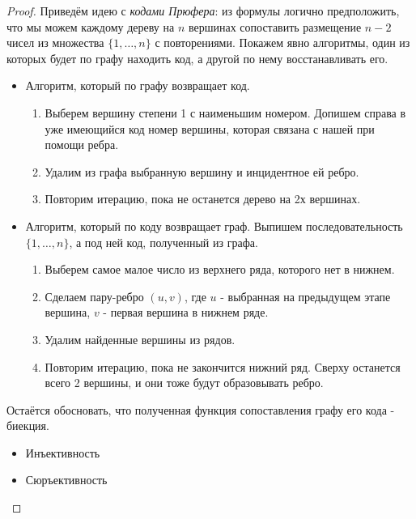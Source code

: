 \begin{proof}
	Приведём идею с \textit{кодами Прюфера}: из формулы логично предположить, что мы можем каждому дереву на $n$ вершинах сопоставить размещение $n - 2$ чисел из множества $\{1, \ldots, n\}$ с повторениями. Покажем явно алгоритмы, один из которых будет по графу находить код, а другой по нему восстанавливать его.
	\begin{itemize}
		\item Алгоритм, который по графу возвращает код.
		\begin{enumerate}
			\item Выберем вершину степени 1 с наименьшим номером. Допишем справа в уже имеющийся код номер вершины, которая связана с нашей при помощи ребра.
			
			\item Удалим из графа выбранную вершину и инцидентное ей ребро.
			
			\item Повторим итерацию, пока не останется дерево на 2х вершинах.
		\end{enumerate}
		
		\item Алгоритм, который по коду возвращает граф.
		Выпишем последовательность $\{1, \ldots, n\}$, а под ней код, полученный из графа.
		\begin{enumerate}
			\item Выберем самое малое число из верхнего ряда, которого нет в нижнем.
			
			\item Сделаем пару-ребро $(u, v)$, где $u$ - выбранная на предыдущем этапе вершина, $v$ - первая вершина в нижнем ряде.
			
			\item Удалим найденные вершины из рядов.
			
			\item Повторим итерацию, пока не закончится нижний ряд. Сверху останется всего 2 вершины, и они тоже будут образовывать ребро.
		\end{enumerate}
	\end{itemize}

	Остаётся обосновать, что полученная функция сопоставления графу его кода - биекция.
	\begin{itemize}
		\item Инъективность
		
		\item Сюръективность
	\end{itemize}
\end{proof}


